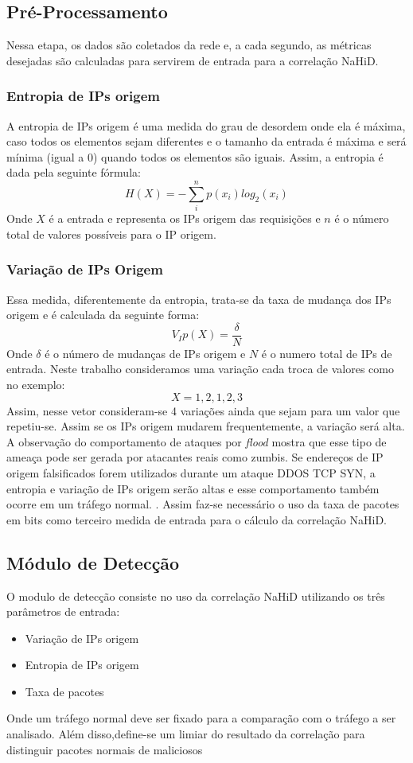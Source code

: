 \subsection{Pré-Processamento}
Nessa etapa, os dados são coletados da rede e, a cada segundo, as métricas desejadas são calculadas para servirem de entrada para a correlação NaHiD. 
\subsubsection{Entropia de IPs origem}
A entropia de IPs origem é uma medida do grau de desordem onde ela é máxima, caso todos os elementos sejam diferentes e o tamanho da entrada é máxima e será mínima (igual a 0) quando todos os elementos são iguais. Assim, a entropia é dada pela seguinte fórmula:
\begin{equation}
H(X) = - \sum_{i}^{n}p(x_i)log_2(x_i)
\end{equation}
Onde $X$ é a entrada e representa os IPs origem das requisições e $n$ é o número total de valores possíveis para o IP origem.  
\subsubsection{Variação de IPs Origem}
Essa medida, diferentemente da entropia, trata-se da taxa de mudança dos IPs origem e é calculada da seguinte forma:
\begin{equation}
	V_Ip(X) = \frac{\delta}{N}
\end{equation}
Onde $\delta$ é o número de mudanças de IPs origem e $N$ é o numero total de IPs de entrada. Neste trabalho consideramos uma variação cada troca de valores como no exemplo:
\begin{equation}
	X = {1,2,1,2,3}
\end{equation}
Assim, nesse vetor consideram-se 4 variações ainda que sejam para um valor que repetiu-se. Assim se os IPs origem mudarem frequentemente, a variação será alta. \cite{NHOQUE}
\\
A observação do comportamento de ataques por \textit{flood} mostra que esse tipo de ameaça pode ser gerada por atacantes reais como zumbis. Se endereços de IP origem falsificados forem utilizados durante um ataque DDOS TCP SYN, a entropia e variação de IPs origem serão altas e esse comportamento também ocorre em um tráfego normal. \cite{NHOQUE}. Assim faz-se necessário o uso da taxa de pacotes em bits como terceiro medida de entrada para o cálculo da correlação NaHiD.

\subsection{Módulo de Detecção}
O modulo de detecção consiste no uso da correlação NaHiD utilizando os três parâmetros de entrada:
\begin{itemize}
	\item Variação de IPs origem
	\item Entropia de IPs origem
	\item Taxa de pacotes
\end{itemize}
Onde um tráfego normal deve ser fixado para a comparação com o tráfego a ser analisado. Além disso,define-se um limiar do resultado da correlação para distinguir pacotes normais de maliciosos 
